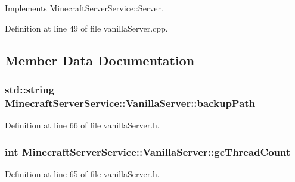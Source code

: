 Implements \hyperlink{class_minecraft_server_service_1_1_server_a0715bfc451f5abbd2f47d0895e5a2355}{Minecraft\+Server\+Service\+::\+Server}.



Definition at line 49 of file vanilla\+Server.\+cpp.



\subsection{Member Data Documentation}
\subsubsection[{\texorpdfstring{backup\+Path}{backupPath}}]{\setlength{\rightskip}{0pt plus 5cm}std\+::string Minecraft\+Server\+Service\+::\+Vanilla\+Server\+::backup\+Path\hspace{0.3cm}{\ttfamily [protected]}}\hypertarget{class_minecraft_server_service_1_1_vanilla_server_a3e69116180a7fc5acd2a0b934a46c312}{}\label{class_minecraft_server_service_1_1_vanilla_server_a3e69116180a7fc5acd2a0b934a46c312}


Definition at line 66 of file vanilla\+Server.\+h.

\subsubsection[{\texorpdfstring{gc\+Thread\+Count}{gcThreadCount}}]{\setlength{\rightskip}{0pt plus 5cm}int Minecraft\+Server\+Service\+::\+Vanilla\+Server\+::gc\+Thread\+Count\hspace{0.3cm}{\ttfamily [protected]}}\hypertarget{class_minecraft_server_service_1_1_vanilla_server_ad1097ba0b31d2f9f48fdbaf095b0e473}{}\label{class_minecraft_server_service_1_1_vanilla_server_ad1097ba0b31d2f9f48fdbaf095b0e473}


Definition at line 65 of file vanilla\+Server.\+h.

